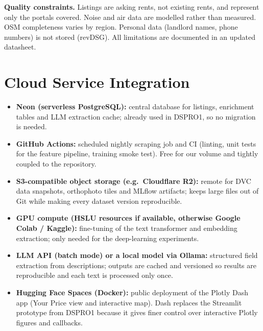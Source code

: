 \documentclass[11pt,a4paper]{article}
\begin{document}
\textbf{Quality constraints.} Listings are asking rents, not existing rents, and represent only the portals covered. Noise and air data are modelled rather than measured. OSM completeness varies by region. Personal data (landlord names, phone numbers) is not stored (revDSG). All limitations are documented in an updated datasheet.

\section{Cloud Service Integration}
\begin{itemize}
    \item \textbf{Neon (serverless PostgreSQL):} central database for listings, enrichment tables and LLM extraction cache; already used in DSPRO1, so no migration is needed.
    \item \textbf{GitHub Actions:} scheduled nightly scraping job and CI (linting, unit tests for the feature pipeline, training smoke test). Free for our volume and tightly coupled to the repository.
    \item \textbf{S3-compatible object storage (e.g.\ Cloudflare R2):} remote for DVC data snapshots, orthophoto tiles and MLflow artifacts; keeps large files out of Git while making every dataset version reproducible.
    \item \textbf{GPU compute (HSLU resources if available, otherwise Google Colab / Kaggle):} fine-tuning of the text transformer and embedding extraction; only needed for the deep-learning experiments.
    \item \textbf{LLM API (batch mode) or a local model via Ollama:} structured field extraction from descriptions; outputs are cached and versioned so results are reproducible and each text is processed only once.
    \item \textbf{Hugging Face Spaces (Docker):} public deployment of the Plotly Dash app (Your Price view and interactive map). Dash replaces the Streamlit prototype from DSPRO1 because it gives finer control over interactive Plotly figures and callbacks.
\end{itemize}

\end{document}
